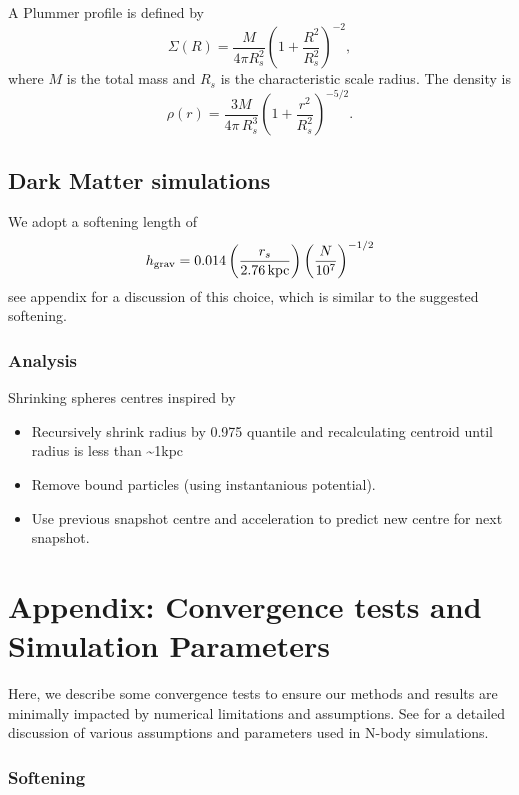 A Plummer profile is defined by \[
\Sigma(R) = \frac{M}{4\pi R_s^2} \left(1 + \frac{R^2}{R_s^2}\right)^{-2} ,
\] where \(M\) is the total mass and \(R_s\) is the characteristic scale
radius. The density is \[
\rho(r) = \frac{3M}{4\pi\,R_s^3} \left(1 + \frac{r^2}{R_s^2}\right)^{-5/2}.
\]

\subsection{Dark Matter simulations}\label{dark-matter-simulations}

We adopt a softening length of \[
h_{\rm grav} = 0.014 \left(\frac{r_s}{2.76\,{\rm kpc}}\right)\left(\frac{N}{10^7}\right)^{-1/2}
\] see appendix for a discussion of this choice, which is similar to the
\citet{power+2003} suggested softening.

\subsubsection{Analysis}\label{analysis}

Shrinking spheres centres inspired by \citet{power+2003}

\begin{itemize}
\tightlist
\item
  Recursively shrink radius by 0.975 quantile and recalculating centroid
  until radius is less than \textasciitilde1kpc
\item
  Remove bound particles (using instantanious potential).
\item
  Use previous snapshot centre and acceleration to predict new centre
  for next snapshot.
\end{itemize}

\section{Appendix: Convergence tests and Simulation
Parameters}\label{appendix-convergence-tests-and-simulation-parameters}

Here, we describe some convergence tests to ensure our methods and
results are minimally impacted by numerical limitations and assumptions.
See \citet{power+2003} for a detailed discussion of various assumptions
and parameters used in N-body simulations.

\subsubsection{Softening}\label{softening}

